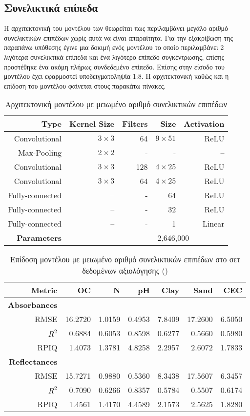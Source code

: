 \subsection{Συνελικτικά επίπεδα}
Η αρχιτεκτονική του μοντέλου των  θεωρείται πως περιλαμβάνει μεγάλο αριθμό συνελικτικών επιπέδων χωρίς αυτά να είναι απαραίτητα. Για την εξακρίβωση της παραπάνω υπόθεσης έγινε μια δοκιμή ενός μοντέλου το οποίο περιλαμβάνει 2 λιγότερα συνελικτικά επίπεδα και ένα λιγότερο επίπεδο συγκέντρωσης, επίσης προστέθηκε ένα ακόμη πλήρως συνδεδεμένο επίπεδο. Επίσης στην είσοδο του μοντέλου έχει εφαρμοστεί υποδειγματοληψία 1:8. Η αρχιτεκτονική καθώς και η επίδοση του μοντέλου φαίνεται στους παρακάτω πίνακες.

\begin{table}[H]
    \centering
    \caption{Αρχιτεκτονική μοντέλου με μειωμένο αριθμό συνελικτικών επιπέδων}
    \begin{tabular}{@{}rrrrr@{}}\toprule
        Type&Kernel Size&Filters&Size&Activation\\
        \midrule
        Convolutional&$3 \times 3$&64&$9 \times 51$&ReLU\\
        Max-Pooling&$2 \times 2$&-&-&–\\
        Convolutional&$3 \times 3$&128&$4 \times 25$&ReLU\\
        Convolutional&$3 \times 3$&64&$4 \times 25$&ReLU\\
        Fully-connected&–&-&64&ReLU\\
        Fully-connected&–&-&32&ReLU\\
        Fully-connected&–&-&1&Linear\\
        \hline
        \textbf{Parameters}&&\multicolumn{3}{c}{2,646,000}\\
        \bottomrule
    \end{tabular}
\end{table}
\begin{table}[H]
    \centering
    \caption{Επίδοση μοντέλου με μειωμένο αριθμό συνελικτικών επιπέδων στο σετ δεδομένων αξιολόγησης ()}
    \begin{tabular}{@{}rrrrrrr@{}}\toprule
        Metric&OC&N&pH&Clay&Sand&CEC\\
        \midrule
        \textbf{Absorbances}&\multicolumn{6}{c}{}\\
        RMSE&16.2720&1.0159&0.4953&7.8409&17.2600&6.5050\\
        $R^2$&0.6884&0.6053&0.8598&0.6277&0.5660&0.5980\\
        RPIQ&1.4073&1.3781&4.8258&2.2957&2.6072&1.7833\\
        \midrule
        \textbf{Reflectances}&\multicolumn{6}{c}{}\\
        RMSE&15.7271&0.9880&0.5360&8.3438&17.5607&6.3457\\
        $R^2$&0.7090&0.6266&0.8357&0.5784&0.5507&0.6174\\
        RPIQ&1.4561&1.4170&4.4589&2.1573&2.5625&1.8280\\
        \bottomrule
    \end{tabular}
\end{table}

